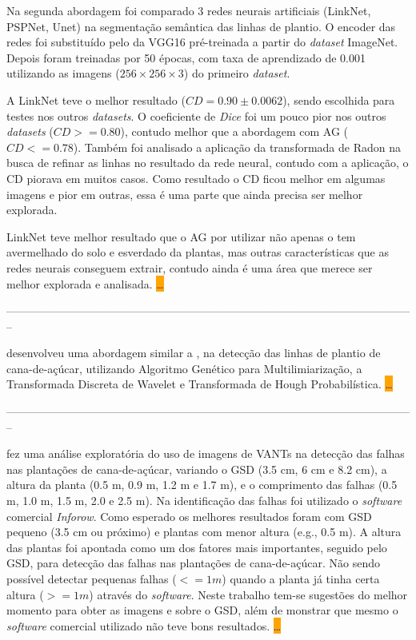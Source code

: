 \documentclass[12pt, a4paper, english, brazil]{article}
\newcommand{\textRed}[1]{{{\color{red} #1}}}
\newcommand{\dotsBlue}{\colorbox{orange}{\textcolor{blue}{\dots}}}
\newcommand{\linePage}{--------------------------------------------------------------------------------------------------------------}
\begin{document}
Na segunda abordagem foi comparado 3 redes neurais artificiais (LinkNet, PSPNet, Unet) na segmentação semântica das linhas de plantio.
O \textRed{encoder} das redes foi substituído pelo da VGG16 pré-treinada a partir do \textit{dataset} ImageNet. Depois foram treinadas por 50 épocas, com taxa de aprendizado de 0.001 utilizando as imagens ($256 \times 256 \times 3$) do primeiro \textit{dataset}.

A LinkNet teve o melhor resultado ($CD = 0.90 \pm 0.0062$), sendo escolhida para testes nos outros \textit{datasets}. O coeficiente de \textit{Dice} foi um pouco pior nos outros \textit{datasets} ($CD >= 0.80$), contudo melhor que a abordagem com AG ($CD <= 0.78$). Também foi analisado a aplicação da transformada de Radon na busca de refinar as linhas no resultado da rede neural, contudo com a aplicação, o CD piorava em muitos casos. Como resultado o CD ficou melhor em algumas imagens e pior em outras, essa é uma parte que ainda precisa ser melhor explorada.

LinkNet teve melhor resultado que o AG por utilizar não apenas o tem avermelhado do solo e esverdado da plantas, mas outras características que as redes neurais conseguem extrair, \textRed{contudo ainda é uma área que merece ser melhor explorada e analisada.} \dotsBlue


\linePage

 desenvolveu uma abordagem similar a , na detecção das linhas de plantio de cana-de-açúcar, utilizando Algoritmo Genético para Multilimiarização, a Transformada
Discreta de Wavelet e Transformada de Hough Probabilística.
\dotsBlue

\linePage

 fez uma análise exploratória do uso de imagens de VANTs na detecção das falhas nas plantações de cana-de-açúcar, variando o GSD (3.5 cm, 6 cm e 8.2 cm), a altura da planta (0.5 m, 0.9 m, 1.2 m e 1.7 m), e o comprimento das falhas (0.5 m, 1.0 m, 1.5 m, 2.0 e 2.5 m). Na identificação das falhas foi utilizado o \textit{software} comercial \textit{Inforow}. Como esperado os melhores resultados foram com GSD pequeno (3.5 cm ou próximo) e plantas com menor altura (e.g., 0.5 m). A altura das plantas foi apontada como um dos fatores mais importantes, seguido pelo GSD, para detecção das falhas nas plantações de cana-de-açúcar. Não sendo possível detectar pequenas falhas  ($<= 1 m$) quando a planta já tinha certa altura ($ >= 1m $) através do \textit{software}. Neste trabalho tem-se sugestões do melhor momento para obter as imagens e sobre o GSD, além de \textRed{monstrar} que mesmo o \textit{software} comercial utilizado não teve bons resultados. \dotsBlue
\end{document}
